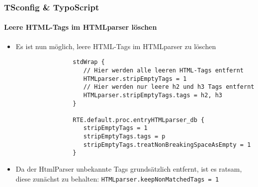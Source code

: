\begin{frame}[fragile]
	\frametitle{TSconfig \& TypoScript}
	\framesubtitle{Leere HTML-Tags im HTMLparser löschen}

	\lstset{basicstyle=\tiny\ttfamily}

	\begin{itemize}
		\item Es ist nun möglich, leere HTML-Tags im HTMLparser zu löschen
			\begin{lstlisting}
				stdWrap {
				   // Hier werden alle leeren HTML-Tags entfernt
				   HTMLparser.stripEmptyTags = 1
				   // Hier werden nur leere h2 und h3 Tags entfernt
				   HTMLparser.stripEmptyTags.tags = h2, h3
				}

				RTE.default.proc.entryHTMLparser_db {
				   stripEmptyTags = 1
				   stripEmptyTags.tags = p
				   stripEmptyTags.treatNonBreakingSpaceAsEmpty = 1
				}
			\end{lstlisting}

			\item Da der HtmlParser unbekannte Tags grundsätzlich entfernt,
				ist es ratsam, diese zunächst zu behalten:\newline
				\texttt{HTMLparser.keepNonMatchedTags = 1}

	\end{itemize}

\end{frame}

